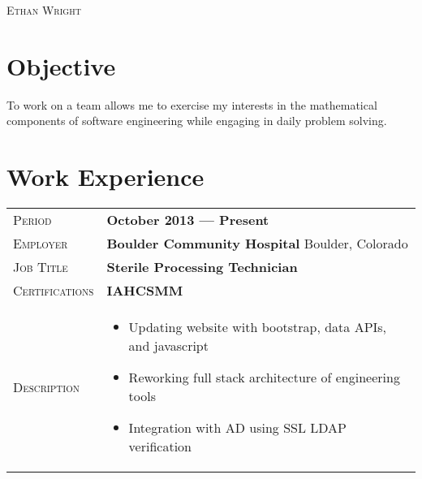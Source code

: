 \documentclass[a4paper, oneside, final]{scrartcl} %
\newcommand{\gray}{\rowcolor[gray]{.90}} %
\begin{document}
\begin{center} %


{\fontsize{36}{36}\selectfont\scshape Ethan Wright} %

\vspace{0.5cm} %


  \section{Objective}
\begin{flushleft}
  To work on a team allows me to exercise my interests in the mathematical components of software engineering 
      while engaging in daily problem solving.
\end{flushleft}

    \section{Work Experience}

    \begin{tabularx}{0.97\linewidth}{>{\raggedleft\scshape}p{3cm}X}
    \gray Period & \textbf{October 2013 --- Present}\\
    \gray Employer & \textbf{Boulder Community Hospital} \hfill Boulder, Colorado\\
    \gray Job Title & \textbf{Sterile Processing Technician}\\
    \gray Certifications & \textbf{IAHCSMM}\\
      Description & \begin{itemize}
          \item Updating website with bootstrap, data APIs, and javascript
                \item Reworking full stack architecture of engineering tools
                      \item Integration with AD using SSL LDAP verification
                            \end{itemize}


\end{tabularx}
\end{center}
\end{document}
